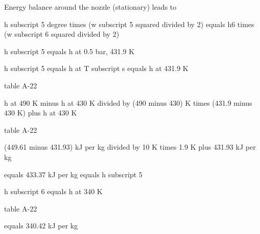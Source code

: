 Energy balance around the nozzle (stationary) leads to

h subscript 5 degree times (w subscript 5 squared divided by 2) equals h6 times (w subscript 6 squared divided by 2)

h subscript 5 equals h at 0.5 bar, 431.9 K

h subscript 5 equals h at T subscript s equals h at 431.9 K

table A-22

h at 490 K minus h at 430 K divided by (490 minus 430) K times (431.9 minus 430 K) plus h at 430 K

table A-22

(449.61 minus 431.93) kJ per kg divided by 10 K times 1.9 K plus 431.93 kJ per kg

equals 433.37 kJ per kg equals h subscript 5

h subscript 6 equals h at 340 K

table A-22

equals 340.42 kJ per kg